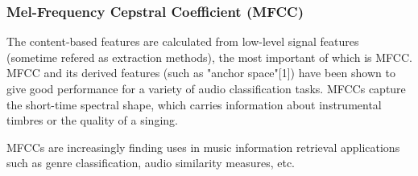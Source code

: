 \documentclass[paper=a4, fontsize=11pt]{scrartcl}
\begin{document}
\subsubsection{Mel-Frequency Cepstral Coefficient (MFCC) }
The content-based features are calculated from low-level signal features (sometime refered as extraction methods), the most important of which is MFCC. MFCC and its derived features (such as "anchor space"[1]) have been shown to give good performance for a variety of audio classification tasks. MFCCs capture the short-time spectral shape, which carries information about instrumental timbres or the quality of a singing. 


%

MFCCs are increasingly finding uses in music information retrieval applications such as genre classification, audio similarity measures, etc.

%
%
\end{document}
